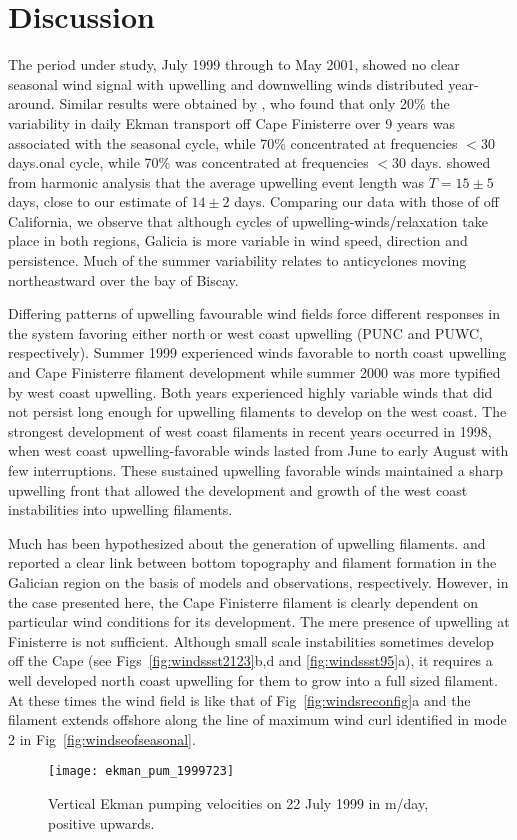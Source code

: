 
\section{Discussion}
The period under study, July 1999 through to May 2001, showed no
clear seasonal wind signal with upwelling and downwelling winds
distributed year-around. Similar results were obtained by
\citet{Nogueira98}, who found that only 20\% the variability in
daily Ekman transport off Cape Finisterre over 9 years was
associated with the seasonal cycle, while 70\% concentrated at
frequencies $<$30 days.onal cycle, while 70\% was concentrated at
frequencies $<$30 days. \citet{Nogueira97} showed from harmonic
analysis that the average upwelling event length was $T=15\pm 5$
days, close to our estimate of $14\pm 2$ days. Comparing our data
with those of \citet{Kosro91} off California, we observe that
although cycles of upwelling-winds/relaxation take place in both
regions, Galicia is more variable in wind speed, direction and
persistence. Much of the summer variability relates to
anticyclones moving northeastward over the bay of Biscay.

Differing patterns of upwelling favourable wind fields force
different responses in the system favoring either north or west
coast upwelling (PUNC and PUWC, respectively). Summer 1999
experienced winds favorable to north coast upwelling and Cape
Finisterre filament development while summer 2000 was more
typified by west coast upwelling. Both years experienced highly
variable winds that did not persist long enough for upwelling
filaments to develop on the west coast. The strongest development
of west coast filaments in recent years occurred in 1998, when
west coast upwelling-favorable winds lasted from June to early
August with few interruptions. These sustained upwelling favorable
winds maintained a sharp upwelling front that allowed the
development and growth of the west coast instabilities into
upwelling filaments.

Much has been hypothesized about the generation of upwelling
filaments.  \citet{Roed99} and \citet{Haynes93} reported a clear
link between bottom topography and filament formation in the
Galician region on the basis of models and observations,
respectively. However, in the case presented here, the Cape
Finisterre filament is clearly dependent on particular wind
conditions for its development. The mere presence of upwelling at
Finisterre is not sufficient. Although small scale instabilities
sometimes develop off the Cape (see Figs~\ref{fig:windssst2123}b,d
and \ref{fig:windssst95}a), it requires a well developed north
coast upwelling for them to grow into a full sized filament. At
these times the wind field is like that of
Fig~\ref{fig:windsreconfig}a and the filament extends offshore
along the line of maximum wind curl identified in mode 2 in
Fig~\ref{fig:windseofseasonal}.
\begin{figure}
\centering
\texttt{[image: ekman\_pum\_1999723]}%
\caption{Vertical Ekman pumping velocities on 22 July 1999 in
m/day, positive upwards.} \label{fig:ekman}
\end{figure}

